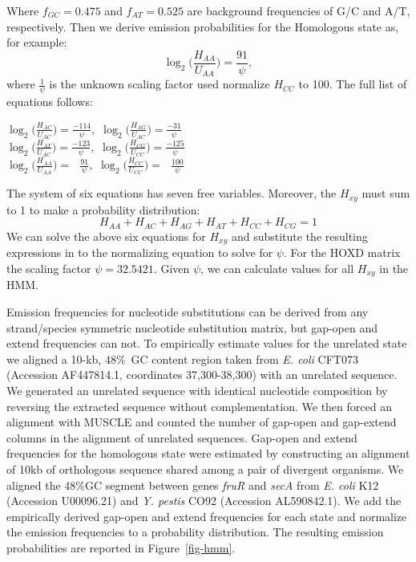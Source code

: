 \documentclass{ws-procs975x65}
\begin{document}
Where $f_{GC}=0.475$ and $f_{AT}=0.525$ are background frequencies of
G/C and A/T, respectively.  Then we derive emission probabilities for
the Homologous state as, for example:
\begin{equation}
\log_{2}\bigg(\frac{H_{AA}}{U_{AA}}\bigg) = \frac{91}{\psi},
\end{equation}
where $\frac{1}{\psi}$ is the unknown scaling factor used normalize $H_{CC}$ to 100. The full list of equations follows:
\begin{center}$\log_{2}\bigg(\frac{H_{AC}}{U_{AC}}\bigg) = \frac{-114}{\psi},$
$\log_{2}\bigg(\frac{H_{AG}}{U_{AC}}\bigg) = \frac{-31}{\psi}$ \\
$\log_{2}\bigg(\frac{H_{AT}}{U_{AC}}\bigg) = \frac{-123}{\psi},$
$\log_{2}\bigg(\frac{H_{CG}}{U_{CC}}\bigg) = \frac{-125}{\psi}$ \\
$\log_{2}\bigg(\frac{H_{AA}}{U_{AA}}\bigg) = \ \ \ \frac{91}{\psi},$
$\log_{2}\bigg(\frac{H_{CC}}{U_{CC}}\bigg) = \ \ \ \frac{100}{\psi}$ \\
\end{center}

The system of six equations has seven free variables.  Moreover, the $H_{xy}$ must sum to 1 to make a probability distribution:
\begin{equation}
H_{AA} + H_{AC} + H_{AG} + H_{AT} + H_{CC} + H_{CG} = 1
\end{equation}
We can solve the above six equations for $H_{xy}$ and substitute the
resulting expressions in to the normalizing equation to solve for
$\psi$. For the HOXD matrix the scaling factor $\psi=32.5421$. Given
$\psi$, we can calculate values for all $H_{xy}$ in the HMM.

Emission frequencies for nucleotide substitutions can be derived from
any strand/species symmetric nucleotide substitution matrix, but gap-open
and extend frequencies can not.  To empirically estimate values
for the unrelated state we aligned a 10-kb, 48\%~GC content region
taken from \emph{E. coli} CFT073 (Accession AF447814.1, coordinates
37,300-38,300) with an unrelated sequence.  We generated an unrelated
sequence with identical nucleotide composition by reversing the
extracted sequence without complementation.  We then forced an
alignment with MUSCLE and counted the number of gap-open and gap-extend
columns in the alignment of unrelated sequences.  Gap-open and
extend frequencies for the homologous state were estimated by
constructing an alignment of 10kb of orthologous sequence shared among
a pair of divergent organisms.  We aligned the 48\%GC segment between
genes \textit{fruR} and \textit{secA} from \textit{E. coli} K12
(Accession U00096.21) and \emph{Y. pestis} CO92 (Accession
AL590842.1). We add the empirically derived gap-open and extend
frequencies for each state and normalize the emission frequencies to a
probability distribution.  The resulting emission probabilities are
reported in Figure~\ref{fig-hmm}.
\end{document}
